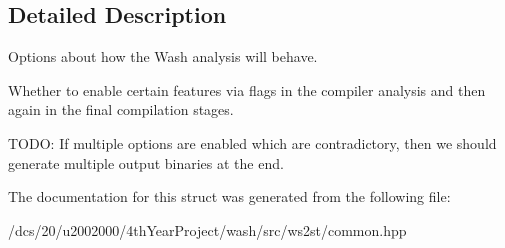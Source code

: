 \subsection{Detailed Description}
Options about how the Wash analysis will behave. 

Whether to enable certain features via flags in the compiler analysis and then again in the final compilation stages.

T\+O\+DO\+: If multiple options are enabled which are contradictory, then we should generate multiple output binaries at the end. 

The documentation for this struct was generated from the following file\+:\begin{DoxyCompactItemize}
\item 
/dcs/20/u2002000/4th\+Year\+Project/wash/src/ws2st/common.\+hpp\end{DoxyCompactItemize}
